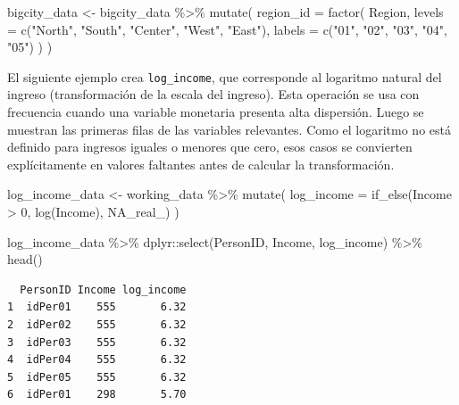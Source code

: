 \documentclass[
  spanish,
  11pt,
  letterpaper,
  oneside,
  open=any]{scrbook}
\newenvironment{Shaded}{\begin{snugshade}}{\end{snugshade}}
\newcommand{\AttributeTok}[1]{\textcolor[rgb]{0.40,0.45,0.13}{#1}}
\newcommand{\ConstantTok}[1]{\textcolor[rgb]{0.56,0.35,0.01}{#1}}
\newcommand{\DecValTok}[1]{\textcolor[rgb]{0.68,0.00,0.00}{#1}}
\newcommand{\FunctionTok}[1]{\textcolor[rgb]{0.28,0.35,0.67}{#1}}
\newcommand{\NormalTok}[1]{\textcolor[rgb]{0.00,0.23,0.31}{#1}}
\newcommand{\OtherTok}[1]{\textcolor[rgb]{0.00,0.23,0.31}{#1}}
\newcommand{\SpecialCharTok}[1]{\textcolor[rgb]{0.37,0.37,0.37}{#1}}
\newcommand{\StringTok}[1]{\textcolor[rgb]{0.13,0.47,0.30}{#1}}
\begin{document}
\begin{Shaded}
\begin{Highlighting}[]
\NormalTok{bigcity\_data }\OtherTok{\textless{}{-}}\NormalTok{ bigcity\_data }\SpecialCharTok{\%\textgreater{}\%}
  \FunctionTok{mutate}\NormalTok{(}
    \AttributeTok{region\_id =} \FunctionTok{factor}\NormalTok{(}
\NormalTok{      Region,}
      \AttributeTok{levels =} \FunctionTok{c}\NormalTok{(}\StringTok{"North"}\NormalTok{, }\StringTok{"South"}\NormalTok{, }\StringTok{"Center"}\NormalTok{, }\StringTok{"West"}\NormalTok{, }\StringTok{"East"}\NormalTok{),}
      \AttributeTok{labels =} \FunctionTok{c}\NormalTok{(}\StringTok{"01"}\NormalTok{, }\StringTok{"02"}\NormalTok{, }\StringTok{"03"}\NormalTok{, }\StringTok{"04"}\NormalTok{, }\StringTok{"05"}\NormalTok{)}
\NormalTok{    )}
\NormalTok{  )}
\end{Highlighting}
\end{Shaded}

El siguiente ejemplo crea \texttt{log\_income}, que corresponde al
logaritmo natural del ingreso (transformación de la escala del ingreso).
Esta operación se usa con frecuencia cuando una variable monetaria
presenta alta dispersión. Luego se muestran las primeras filas de las
variables relevantes. Como el logaritmo no está definido para ingresos
iguales o menores que cero, esos casos se convierten explícitamente en
valores faltantes antes de calcular la transformación.

\begin{Shaded}
\begin{Highlighting}[]
\NormalTok{log\_income\_data }\OtherTok{\textless{}{-}}\NormalTok{ working\_data }\SpecialCharTok{\%\textgreater{}\%}
  \FunctionTok{mutate}\NormalTok{(}
    \AttributeTok{log\_income =} \FunctionTok{if\_else}\NormalTok{(Income }\SpecialCharTok{\textgreater{}} \DecValTok{0}\NormalTok{, }\FunctionTok{log}\NormalTok{(Income), }\ConstantTok{NA\_real\_}\NormalTok{)}
\NormalTok{  )}

\NormalTok{log\_income\_data }\SpecialCharTok{\%\textgreater{}\%}
\NormalTok{  dplyr}\SpecialCharTok{::}\FunctionTok{select}\NormalTok{(PersonID, Income, log\_income) }\SpecialCharTok{\%\textgreater{}\%}
  \FunctionTok{head}\NormalTok{()}
\end{Highlighting}
\end{Shaded}

\begin{verbatim}
  PersonID Income log_income
1  idPer01    555       6.32
2  idPer02    555       6.32
3  idPer03    555       6.32
4  idPer04    555       6.32
5  idPer05    555       6.32
6  idPer01    298       5.70
\end{verbatim}
\end{document}
